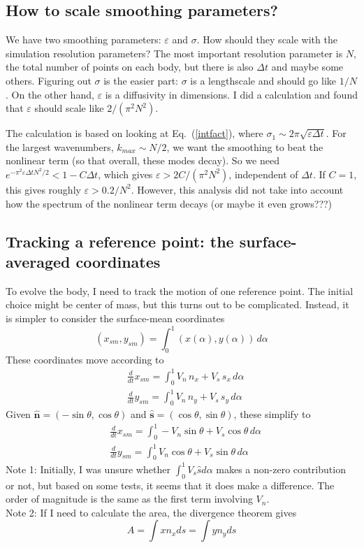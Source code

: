 \documentclass[11pt]{article}
\newcommand{\td}[2] { \frac{d #1} { d #2 } }
\newcommand{\bvec}[1]{\ensuremath{\boldsymbol{#1}}}
\newcommand{\nhat}{\hat{\bvec{n}}}
\newcommand{\shat}{\hat{\bvec{s}}}
\newcommand{\eps}{\varepsilon}
\begin{document}
\subsection{How to scale smoothing parameters?}
We have two smoothing parameters: $\eps$ and $\sigma$. How should they scale with the simulation resolution parameters? The most important resolution parameter is $N$, the total number of points on each body, but there is also $\Delta t$ and maybe some others. Figuring out $\sigma$ is the easier part: $\sigma$ is a lengthscale and should go like $1/N$. On the other hand, $\eps$ is a diffusivity in dimensions. I did a calculation and found that $\eps$ should scale like $2/(\pi^2 N^2)$.

The calculation is based on looking at Eq.~(\ref{intfact}), where $\sigma_1 \sim 2 \pi \sqrt{\eps \Delta t}$. For the largest wavenumbers, $k_{max} \sim N/2$, we want the smoothing to beat the nonlinear term (so that overall, these modes decay). So we need $e^{-\pi^2 \eps \Delta t N^2 / 2} < 1 - C\Delta t$, which gives $\eps > 2C/(\pi^2 N^2)$, independent of $\Delta t$. If $C=1$, this gives roughly $\eps > 0.2/ N^2$. However, this analysis did not take into account how the spectrum of the nonlinear term decays (or maybe it even grows???)


\subsection{Tracking a reference point: the surface-averaged coordinates}
To evolve the body, I need to track the motion of one reference point. The initial choice might be center of mass, but this turns out to be complicated. Instead, it is simpler to consider the surface-mean coordinates
\begin{equation}
(x_{sm}, y_{sm}) = \int_0^1 (x(\alpha), y(\alpha)) \, d\alpha
\end{equation}
These coordinates move according to
\begin{align}
& \td{}{t} x_{sm} = \int_0^1 V_n \, n_x + V_s \, s_x \, d\alpha \\
& \td{}{t} y_{sm} = \int_0^1 V_n \, n_y + V_s \, s_y \, d\alpha
\end{align}
Given $\nhat = (-\sin \theta, \cos \theta)$ and $\shat = (\cos \theta, \sin \theta)$, these simplify to
\begin{align}
& \td{}{t} x_{sm} = \int_0^1 -V_n \sin \theta + V_s \cos \theta \, d\alpha \\
& \td{}{t} y_{sm} = \int_0^1 V_n \cos \theta + V_s \sin \theta \, d\alpha
\end{align}
Note 1: Initially, I was unsure whether $\int_0^1 V_s \hat{s} d\alpha$ makes a non-zero contribution or not, but based on some tests, it seems that it does make a difference. The order of magnitude is the same as the first term involving $V_n$. \\
Note 2: If I need to calculate the area, the divergence theorem gives
\begin{equation}
A = \int x n_x ds = \int y n_y ds
\end{equation}
\end{document}
